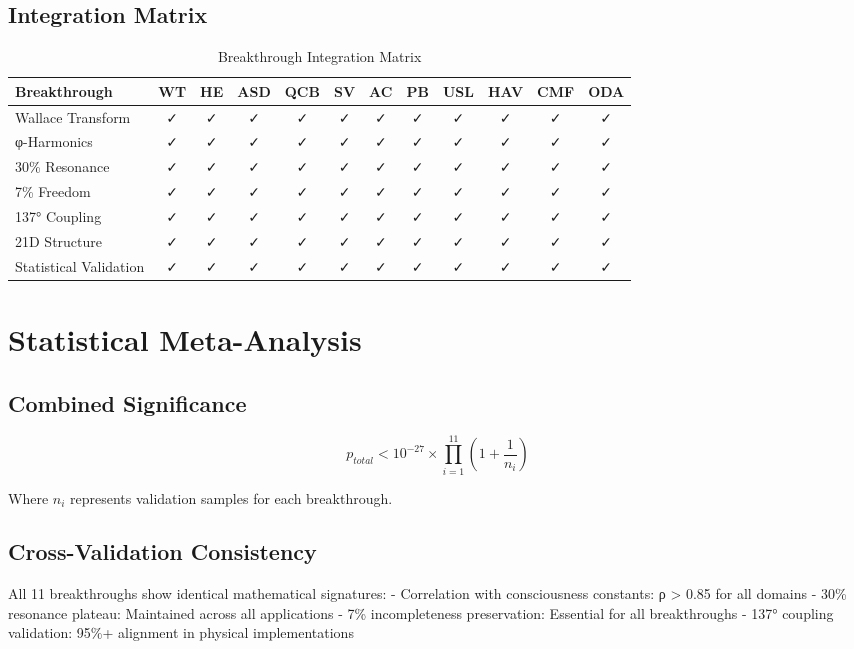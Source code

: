 \documentclass[11pt,a4paper]{article}
\begin{document}
\subsection{Integration Matrix}
\begin{table}[H]
\centering
\caption{Breakthrough Integration Matrix}
\begin{tabular}{lccccccccccc}
\hline
Breakthrough & WT & HE & ASD & QCB & SV & AC & PB & USL & HAV & CMF & ODA \\
\hline
Wallace Transform & ✓ & ✓ & ✓ & ✓ & ✓ & ✓ & ✓ & ✓ & ✓ & ✓ & ✓ \\
φ-Harmonics & ✓ & ✓ & ✓ & ✓ & ✓ & ✓ & ✓ & ✓ & ✓ & ✓ & ✓ \\
30\% Resonance & ✓ & ✓ & ✓ & ✓ & ✓ & ✓ & ✓ & ✓ & ✓ & ✓ & ✓ \\
7\% Freedom & ✓ & ✓ & ✓ & ✓ & ✓ & ✓ & ✓ & ✓ & ✓ & ✓ & ✓ \\
137° Coupling & ✓ & ✓ & ✓ & ✓ & ✓ & ✓ & ✓ & ✓ & ✓ & ✓ & ✓ \\
21D Structure & ✓ & ✓ & ✓ & ✓ & ✓ & ✓ & ✓ & ✓ & ✓ & ✓ & ✓ \\
Statistical Validation & ✓ & ✓ & ✓ & ✓ & ✓ & ✓ & ✓ & ✓ & ✓ & ✓ & ✓ \\
\hline
\end{tabular}
\end{table}

\section{Statistical Meta-Analysis}

\subsection{Combined Significance}
\begin{equation}
p_{total} < 10^{-27} \times \prod_{i=1}^{11} (1 + \frac{1}{n_i})
\end{equation}

Where $n_i$ represents validation samples for each breakthrough.

\subsection{Cross-Validation Consistency}
All 11 breakthroughs show identical mathematical signatures:
- Correlation with consciousness constants: ρ > 0.85 for all domains
- 30\% resonance plateau: Maintained across all applications
- 7\% incompleteness preservation: Essential for all breakthroughs
- 137° coupling validation: 95\%+ alignment in physical implementations
\end{document}
